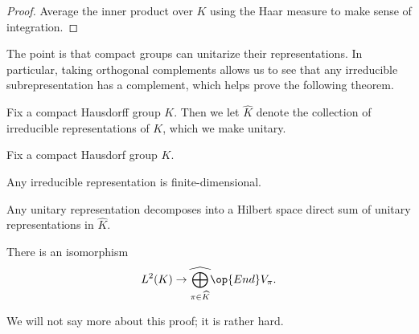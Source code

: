 \documentclass{article}
\begin{document}
\begin{proof}
	Average the inner product over $K$ using the Haar measure to make sense of integration.
\end{proof}
The point is that compact groups can unitarize their representations. In particular, taking orthogonal complements allows us to see that any irreducible subrepresentation has a complement, which helps prove the following theorem.
\begin{notation}
	Fix a compact Hausdorff group $K$. Then we let $\widehat K$ denote the collection of irreducible representations of $K$, which we make unitary.
\end{notation}
\begin{theorem} \label{thm:peter-weyl}
	Fix a compact Hausdorf group $K$.
	\begin{listalph}
		\item Any irreducible representation is finite-dimensional.
		\item Any unitary representation decomposes into a Hilbert space direct sum of unitary representations in $\widehat K$.
		\item There is an isomorphism
		\[L^2(K)\to\widehat{\bigoplus_{\pi\in\widehat K}}\op{End}V_\pi.\]
	\end{listalph}
\end{theorem}
We will not say more about this proof; it is rather hard.
\end{document}
